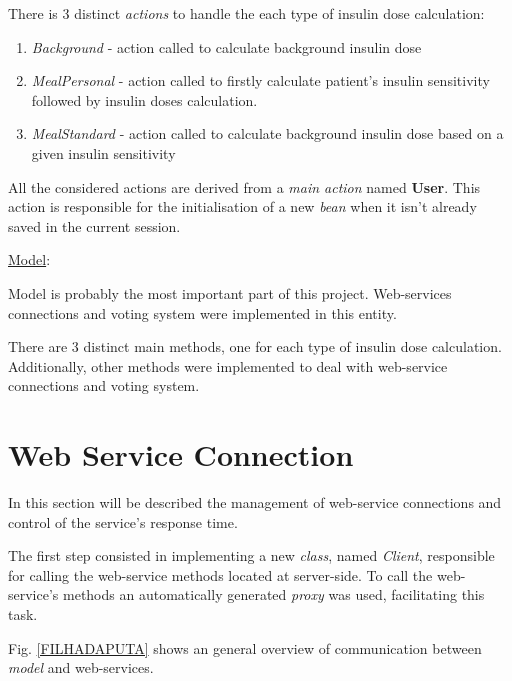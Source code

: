     There is 3 distinct \emph{actions} to handle the each type of insulin dose calculation:
    
    \begin{enumerate}
    \item \emph{Background} - action called to calculate background insulin dose
    \item \emph{MealPersonal} - action called to firstly calculate patient's insulin sensitivity followed by insulin doses calculation.
    \item \emph{MealStandard} - action called to calculate background insulin dose based on a given insulin sensitivity
    \end{enumerate}
    
    All the considered actions are derived from a \emph{main action} named \textbf{User}. This action is responsible for the initialisation of a new \emph{bean} when it isn't already saved in the current session.
    
    \underline{Model}:
    
    Model is probably the most important part of this project. Web-services connections and voting system were implemented in this entity.
    
    There are 3 distinct main methods, one for each type of insulin dose calculation. Additionally, other methods were implemented to deal with web-service connections and voting system.

\section{Web Service Connection}

    In this section will be described the management of web-service connections and control of the service's response time.
    
    The first step consisted in implementing a new \emph{class}, named \emph{Client}, responsible for calling the web-service methods located at server-side. To call the web-service's methods an automatically generated \emph{proxy} was used, facilitating this task.
    
    Fig. \ref{FILHADAPUTA} shows an general overview of communication between \emph{model} and web-services. 
    
